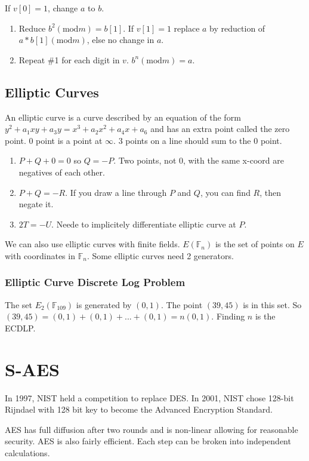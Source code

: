 \documentclass{article}
\begin{document}
If $v[0]=1$, change $a$ to $b$.

\begin{enumerate}
  \item Reduce $b^2(\text{mod}m)=b[1]$. If $v[1]=1$ replace $a$ by reduction of
    $a * b[1](\text{mod}m)$, else no change in $a$.
  \item Repeat \#1 for each digit in $v$. $b^n(\text{mod}m)=a$.
\end{enumerate}

\subsection{Elliptic Curves}
An elliptic curve is a curve described by an equation of the form
$y^2+a_1xy+a_3y=x^3+a_2x^2+a_4x+a_6$ and has an extra point called the zero
point. 0 point is a point at $\infty$. 3 points on a line should sum to the 0
point.

\begin{enumerate}
  \item $P+Q+0=0$ so $Q=-P$. Two points, not 0, with the same x-coord are
    negatives of each other.
  \item $P+Q=-R$. If you draw a line through $P$ and $Q$, you can find $R$,
    then negate it.
  \item $2T=-U$. Neede to implicitely differentiate elliptic curve at $P$.
\end{enumerate}

We can also use elliptic curves with finite fields. $E(\mathbb{F}_n)$ is the
set of points on $E$ with coordinates in $\mathbb{F}_n$. Some elliptic curves
need 2 generators.

\subsubsection{Elliptic Curve Discrete Log Problem}
The set $E_2(\mathbb{F}_{109})$ is generated by $(0,1)$. The point $(39,45)$ is
in this set. So $(39,45)=(0,1)+(0,1)+...+(0,1)=n(0,1)$. Finding $n$ is the
ECDLP.

\section{S-AES}
In 1997, NIST held a competition to replace DES. In 2001, NIST chose 128-bit
Rijndael with 128 bit key to become the Advanced Encryption Standard.

AES has full diffusion after two rounds and is non-linear allowing for
reasonable security. AES is also fairly efficient. Each step can be broken into
independent calculations.
\end{document}
